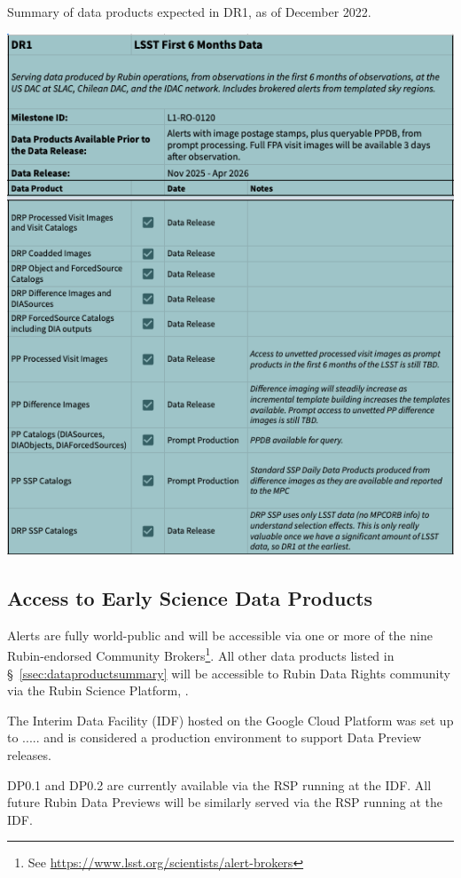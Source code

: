 \begin{table}
\caption{Summary of data products expected in DR1, as of December 2022.}
\label{tab:dr-one-products}
\includegraphics[width=\linewidth]{figures/DR1-products}
\end{table}


\subsection{Access to Early Science  Data Products} \label{ssec:dataaccess}
Alerts are fully world-public and will be accessible via one or more of the nine Rubin-endorsed Community Brokers\footnote{See \url{https://www.lsst.org/scientists/alert-brokers}}.
All other data products listed in \S~\ref{ssec:dataproductsummary} will be accessible to Rubin Data Rights community via the Rubin Science Platform, \citep{LSE-319}.

The Interim Data Facility (IDF) hosted on the Google Cloud Platform was set up to ..... and  is considered a production environment to support Data Preview releases. 

DP0.1 and DP0.2 are currently available via the RSP running at the IDF.
All future Rubin Data Previews will be similarly served via the RSP running at the IDF. 
